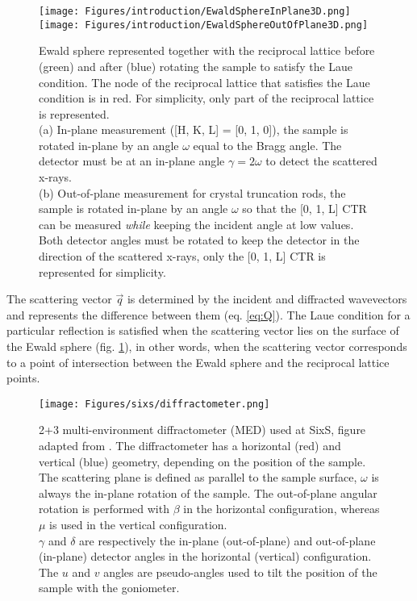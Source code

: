 \begin{figure}[!htb]
    \centering
    \texttt{[image: Figures/introduction/EwaldSphereInPlane3D.png]}
    \texttt{[image: Figures/introduction/EwaldSphereOutOfPlane3D.png]}
    \caption{
    Ewald sphere represented together with the reciprocal lattice before (green) and after (blue) rotating the sample to satisfy the Laue condition.
    The node of the reciprocal lattice that satisfies the Laue condition is in red.
    For simplicity, only part of the reciprocal lattice is represented.\\
    (a) In-plane measurement ([H, K, L] = [0, 1, 0]), the sample is rotated in-plane by an angle $\omega$ equal to the Bragg angle.
    The detector must be at an in-plane angle $\gamma=2\omega$ to detect the scattered x-rays.\\
    (b) Out-of-plane measurement for crystal truncation rods, the sample is rotated in-plane by an angle $\omega$ so that the [0, 1, L] CTR can be measured \textit{while} keeping the incident angle at low values.
    Both detector angles must be rotated to keep the detector in the direction of the scattered x-rays, only the [0, 1, L] CTR is represented for simplicity.
    }
    \label{fig:EwaldSphere}
\end{figure}

The scattering vector $\vec{q}$ is determined by the incident and diffracted wavevectors and represents the difference between them (eq. \ref{eq:Q}).
The Laue condition for a particular reflection is satisfied when the scattering vector lies on the surface of the Ewald sphere (fig. \ref{fig:EwaldSphere}), in other words, when the scattering vector corresponds to a point of intersection between the Ewald sphere and the reciprocal lattice points.

\begin{figure}[!htb]
    \centering
    \texttt{[image: Figures/sixs/diffractometer.png]}
    \caption{
    2+3 multi-environment diffractometer (MED) used at SixS, figure adapted from \cite{Schleputz2011}.
    The diffractometer has a horizontal (red) and vertical (blue) geometry, depending on the position of the sample.\\
    The scattering plane is defined as parallel to the sample surface, $\omega$ is always the in-plane rotation of the sample.
    The out-of-plane angular rotation is performed with $\beta$ in the horizontal configuration, whereas $\mu$ is used in the vertical configuration.\\
    $\gamma$ and $\delta$ are respectively the in-plane (out-of-plane) and out-of-plane (in-plane) detector angles in the horizontal (vertical) configuration.\\
    The $u$ and $v$ angles are pseudo-angles used to tilt the position of the sample with the goniometer.
    }
    \label{fig:Diffractometer}
\end{figure}

